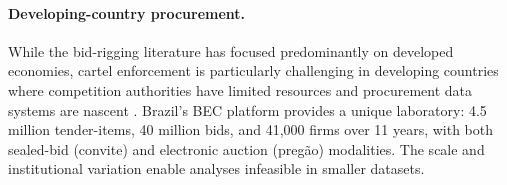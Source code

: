 \paragraph{Developing-country procurement.}
While the bid-rigging literature has focused predominantly on developed
economies, cartel enforcement is particularly challenging in developing
countries where competition authorities have limited resources and
procurement data systems are nascent
\citep{sanchezgraells2019screening}. Brazil's BEC platform provides a
unique laboratory: 4.5 million tender-items, 40 million bids, and 41,000
firms over 11 years, with both sealed-bid (convite) and electronic
auction (preg\~ao) modalities. The scale and institutional variation
enable analyses infeasible in smaller datasets.
